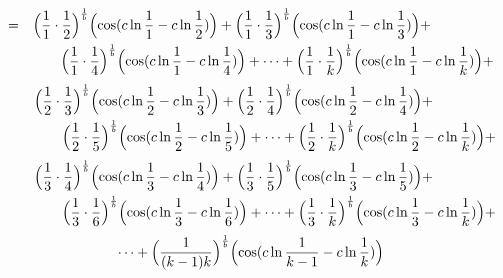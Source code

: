 \documentclass{amsart}
\begin{document}
	\[
	\begin{aligned}
		= \quad & \Bigl( \frac{1}{1} \cdot \frac{1}{2} \Bigr)^\frac1b \Bigl( \cos(c \ln \frac{1}{1} - c \ln \frac{1}{2}) \Bigr) + \Bigl( \frac{1}{1} \cdot \frac{1}{3} \Bigr)^\frac1b \Bigl( \cos(c \ln \frac{1}{1} - c \ln \frac{1}{3}) \Bigr) + \\
		& \qquad \Bigl( \frac{1}{1} \cdot \frac{1}{4} \Bigr)^\frac1b \Bigl( \cos(c \ln \frac{1}{1} - c \ln \frac{1}{4}) \Bigr) + \dots  + \Bigl( \frac{1}{1} \cdot \frac{1}{k} \Bigr)^\frac1b \Bigl( \cos(c \ln \frac{1}{1} - c \ln \frac{1}{k}) \Bigr) + 
	\end{aligned}
	\]
	\[
	\begin{aligned}
		\quad\quad & \Bigl( \frac{1}{2} \cdot \frac{1}{3} \Bigr)^\frac1b \Bigl( \cos(c \ln \frac{1}{2} - c \ln \frac{1}{3}) \Bigr) + \Bigl( \frac{1}{2} \cdot \frac{1}{4} \Bigr)^\frac1b \Bigl( \cos(c \ln \frac{1}{2} - c \ln \frac{1}{4}) \Bigr) + \\
		& \qquad \Bigl( \frac{1}{2} \cdot \frac{1}{5} \Bigr)^\frac1b \Bigl( \cos(c \ln \frac{1}{2} - c \ln\frac{1}{5}) \Bigr) + \dots  + \Bigl( \frac{1}{2} \cdot \frac{1}{k} \Bigr)^\frac1b \Bigl( \cos(c \ln \frac{1}{2} - c \ln \frac{1}{k}) \Bigr) + 
	\end{aligned}
	\]
	\[
	\begin{aligned}
		\quad\quad & \Bigl( \frac{1}{3} \cdot \frac{1}{4} \Bigr)^\frac1b \Bigl( \cos(c \ln \frac{1}{3} - c \ln \frac{1}{4}) \Bigr) + \Bigl( \frac{1}{3} \cdot \frac{1}{5} \Bigr)^\frac1b \Bigl( \cos(c \ln \frac{1}{3} - c \ln \frac{1}{5}) \Bigr) + \\
		& \qquad \Bigl( \frac{1}{3} \cdot \frac{1}{6} \Bigr)^\frac1b \Bigl( \cos(c \ln \frac{1}{3} - c \ln \frac{1}{6}) \Bigr) + \dots  + \Bigl( \frac{1}{3} \cdot \frac{1}{k} \Bigr)^\frac1b \Bigl( \cos(c \ln \frac{1}{3} - c \ln \frac{1}{k}) \Bigr) + 
	\end{aligned}
	\]
	\[ \dots + \Bigl( \frac{1}{(k-1)k} \Bigr)^\frac1b \Bigl( \cos(c \ln \frac{1}{k-1} - c \ln \frac{1}{k}) \Bigr) \]
	\[\]
	
\end{document}
